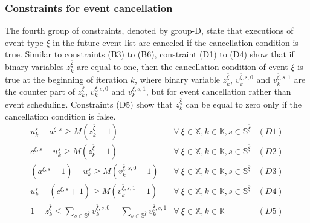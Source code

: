 \documentclass[]{interact}
\theoremstyle{plain}%
\theoremstyle{definition}
\theoremstyle{remark}
\begin{document}
\subsubsection{Constraints for event cancellation}\label{sec:const_D}
The fourth group of constraints, denoted by group-D, state that executions of event type ${\xi}$ in the future event list are canceled if the cancellation condition is true. Similar to constraints (B3) to (B6), constraint (D1) to (D4) show that if binary variables $z^{\bar{\xi}}_{k}$ are equal to one, then the cancellation condition of event ${\xi}$ is true at the beginning of iteration $k$, where binary variable $z^{\bar{\xi}}_{k}$, $v^{\bar{\xi},s,0}_k$ and $v^{\bar{\xi},s,1}_k$ are the counter part of $z^{\xi}_{k}$, $v^{\xi,s,0}_k$ and $v^{\xi,s,1}_k$, but for event cancellation rather than event scheduling. %
Constraints (D5) show that $z^{\bar{\xi}}_{k}$ can be equal to zero only if the cancellation condition is false. 
\begin{eqnarray}
u^s_k - a^{\bar{\xi},s} \ge M(z^{\bar{\xi}}_{k}-1)&\forall\ \xi\in \mathbb{X},k\in \mathbb{K},s\in \mathbb{S}^{\bar{\xi}}&(D1)\nonumber\\
c^{\bar{\xi},s} - u^s_k \ge M(z^{\bar{\xi}}_{k}-1)&\forall\ \xi\in \mathbb{X},k\in \mathbb{K},s\in \mathbb{S}^{\bar{\xi}}&(D2)\nonumber\\
( a^{\bar{\xi},s}-1) - u^s_k \ge M(v^{\bar{\xi},s,0}_k-1) & \forall\ \xi\in \mathbb{X},k\in \mathbb{K},s\in \mathbb{S}^{\bar{\xi}} &(D3)\nonumber\\
u^s_k -  (c^{\bar{\xi},s}+1) \ge M(v^{\bar{\xi},s,1}_k-1) & \forall\ \xi\in \mathbb{X},k\in \mathbb{K},s\in \mathbb{S}^{\bar{\xi}} &(D4)\nonumber\\
1 - z^{\bar{\xi}}_{k} \le \sum_{s\in \mathbb{S}^{\bar{\xi}}} v^{\bar{\xi},s,0}_k + \sum_{s\in \mathbb{S}^{\bar{\xi}}} v^{\bar{\xi},s,1}_k&\forall\ \xi\in \mathbb{X},k\in \mathbb{K}&(D5)\nonumber
\end{eqnarray}
\end{document}
